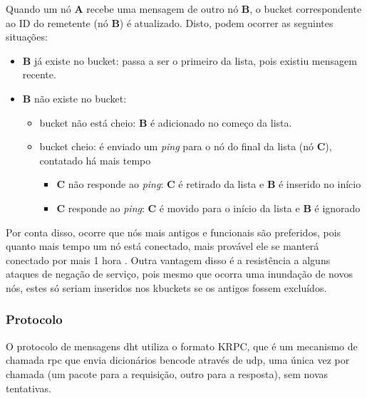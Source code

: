 Quando um nó \textbf{A} recebe uma mensagem de outro nó \textbf{B}, o \gls*{bucket}
correspondente ao ID do remetente (nó \textbf{B}) é atualizado. Disto, podem ocorrer as
seguintes situações:

\begin{itemize}
    \item \textbf{B} já existe no \gls*{bucket}: passa a ser o primeiro da lista, pois
        existiu mensagem recente.

    \item \textbf{B} não existe no \gls*{bucket}:
        \begin{itemize}
            \item \gls*{bucket} não está cheio: \textbf{B} é adicionado no começo da
                lista.
            \item \gls*{bucket} cheio: é enviado um \emph{ping} para o nó do final da
                lista (nó \textbf{C}), contatado há mais tempo

            \begin{itemize}
                \item \textbf{C} não responde ao \emph{ping}: \textbf{C} é retirado da
                lista e \textbf{B} é inserido no início
                \item \textbf{C} responde ao \emph{ping}: \textbf{C} é movido para o
                início da lista e \textbf{B} é ignorado
            \end{itemize}
        \end{itemize}

\end{itemize}

Por conta disso, ocorre que nós mais antigos e funcionais são preferidos, pois quanto
mais tempo um nó está conectado, mais provável ele se manterá conectado por mais 1 hora
\cite{artigo:gnutella-uptime}. Outra vantagem disso é a resistência a alguns ataques de
negação de serviço, pois mesmo que ocorra uma inundação de novos nós, estes só seriam
inseridos nos \glspl*{kbucket} se os antigos fossem excluídos.

\subsubsection*{Protocolo}

O protocolo de mensagens \gls*{dht} utiliza o formato KRPC, que é um mecanismo de
chamada \gls{rpc} que envia dicionários \gls*{bencode} através de \gls*{udp}, uma única
vez por chamada (um pacote para a requisição, outro para a resposta), sem novas
tentativas.

